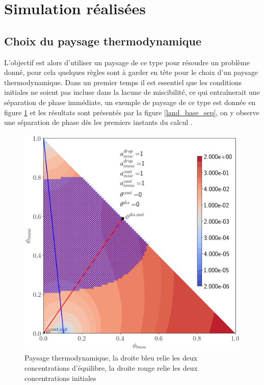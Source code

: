 \section{Simulation réalisées}
\subsection{Choix du paysage thermodynamique}
L'objectif est alors d'utiliser un paysage de ce type pour résoudre un problème donné, pour cela quelques règles sont à garder en tête pour le choix d'un paysage thermodynamique. Dans un premier temps il est essentiel que les conditions initiales ne soient pas incluse dans la lacune de miscibilité, ce qui entraînerait une séparation de phase immédiate, un exemple de paysage de ce type est donnée en figure \ref{fig:landscapebase} et les résultats sont présentés par la figure \ref{land_base_sep}, on y observe une séparation de phase dès les premiers instants du calcul .
 \begin{figure}[H]
 	\centering
 	\includegraphics[width=0.4\linewidth]{figure/landscape_base.png}
 	\caption[Paysage thermodynamique]{Paysage thermodynamique, la droite bleu relie les deux  concentrations d'équilibre, la droite rouge relie les deux concentrations initiales}
 	\label{fig:landscapebase}
 \end{figure}
\vspace{-0.5cm}
